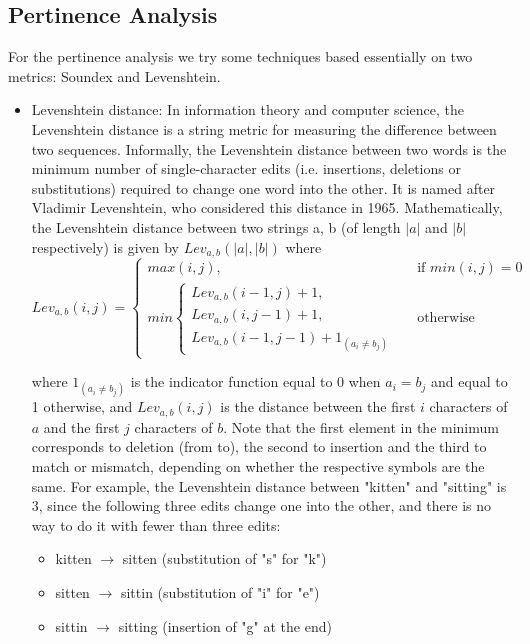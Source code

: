 \documentclass[conference, onecolumn]{IEEEtran}
\begin{document}
\subsection{Pertinence Analysis}
\medskip
For the pertinence analysis we try some techniques based essentially on two metrics: Soundex and Levenshtein.
\begin{itemize}
	\item
	Levenshtein distance:
	In information theory and computer science, the Levenshtein distance is a string metric for measuring the difference between two sequences. Informally, the Levenshtein distance between two words is the minimum number of single-character edits (i.e. insertions, deletions or substitutions) required to change one word into the other. It is named after Vladimir Levenshtein, who considered this distance in 1965.
	Mathematically, the Levenshtein distance between two strings a, b (of length $|a|$ and $|b|$ respectively) is given by $ Lev_{a,b}(|a|,|b|)$ where
	$$Lev_{a,b}(i,j)=\begin{cases} max(i,j), & \mbox{if }min(i,j)=0 \\ min \begin{cases}	Lev_{a,b}(i-1,j)+1, & \\Lev_{a,b}(i,j-1)+1,&\\Lev_{a,b}(i-1,j-1)+1_{(a_i \ne b_j)} & \end{cases} & \mbox{otherwise }	\end{cases}$$
	
	where ${1_{(a_i \ne b_j)}}$ is the indicator function equal to 0 when ${a_i = b_j}$ and equal to 1 otherwise, and $Lev_{a,b}(i,j)$ is the distance between the first $i$ characters of $a$ and the first $j$ characters of $b$.
	Note that the first element in the minimum corresponds to deletion (from  to), the second to insertion and the third to match or mismatch, depending on whether the respective symbols are the same.
	For example, the Levenshtein distance between "kitten" and "sitting" is 3, since the following three edits change one into the other, and there is no way to do it with fewer than three edits:
	\begin{itemize}
	\item kitten $\to$ sitten (substitution of "s" for "k")
	\item sitten $\to$ sittin (substitution of "i" for "e")
	\item sittin $\to$ sitting (insertion of "g" at the end)
	\end{itemize}


\end{itemize}
\end{document}
